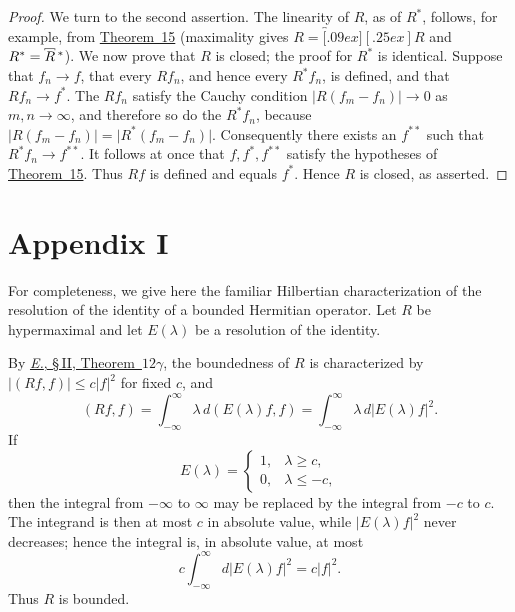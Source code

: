 \documentclass[
  paper=b5,
  twoside=true,
  fontsize=13pt,
  headings=normal,
  bookmarkpackage=false
]{scrartcl}
\theoremstyle{definition}
\newcommand{\TheoremRef}[1]{\hyperref[thm:#1]{Theorem~#1}}
\newcommand{\ErefText}[1]{\href{https://doi.org/10.1007/BF01782338}{#1}}
\newcommand{\MaximalExtension}[1]{\overbracket[.09ex][.25ex]{#1}}
\newcommand{\AdjointMaximalExtension}[1]{\MaximalExtension{#1}\vphantom{#1}^{*}}
\begin{document}
\begin{proof}
We turn to the second assertion.  The linearity of \(R\), as of \(R^{*}\),
follows, for example, from \TheoremRef{15} (maximality gives
\(R=\MaximalExtension{R}\) and \(R^{*}=\AdjointMaximalExtension{R}\)).  We now prove that
\(R\) is closed; the proof for \(R^{*}\) is identical.  Suppose that
\(f_n\to f\), that every \(Rf_n\), and hence every \(R^{*}f_n\), is
defined, and that \(Rf_n\to f^{*}\).  The \(Rf_n\) satisfy the Cauchy condition
\(\lvert R(f_m-f_n)\rvert\longrightarrow0\) as \(m,n\to\infty\), and
therefore so do the \(R^{*}f_n\), because
\(\lvert R(f_m-f_n)\rvert=\lvert R^{*}(f_m-f_n)\rvert\). Consequently there exists an \(f^{**}\) such that
\(R^{*}f_n\to f^{**}\).  It follows at once that \(f,f^{*},f^{**}\)
satisfy the hypotheses of \TheoremRef{15}.  Thus \(Rf\) is defined and equals
\(f^{*}\).  Hence \(R\) is closed, as asserted.
\end{proof}

\section*{Appendix I}
\label{app:bounded-spectral-families}

For completeness, we give here the familiar Hilbertian characterization
of the resolution of the identity of a bounded Hermitian operator.  Let
\(R\) be hypermaximal and let \(E(\lambda)\) be a resolution of the
identity.

By \ErefText{\emph{E.}, \S\,II, Theorem~\(12\gamma\)}, the boundedness
of \(R\) is characterized by \(\lvert(Rf,f)\rvert\leq c\lvert f\rvert^{2}\)
for fixed \(c\), and
\[
  (Rf,f)
  =
  \int_{-\infty}^{\infty}\lambda\,d(E(\lambda)f,f)
  =
  \int_{-\infty}^{\infty}\lambda\,d\lvert E(\lambda)f\rvert^{2}.
\]
If
\[
  E(\lambda)=
  \begin{cases}
    1,&\lambda\geq c,\\
    0,&\lambda\leq -c,
  \end{cases}
\]
then the integral from \(-\infty\) to \(\infty\) may be replaced by the
integral from \(-c\) to \(c\).  The integrand is then at most \(c\) in
absolute value, while \(\lvert E(\lambda)f\rvert^{2}\) never decreases;
hence the integral is, in absolute value, at most
\[
  c\int_{-\infty}^{\infty}d\lvert E(\lambda)f\rvert^{2}
  =
  c\lvert f\rvert^{2}.
\]
Thus \(R\) is bounded.
\end{document}

